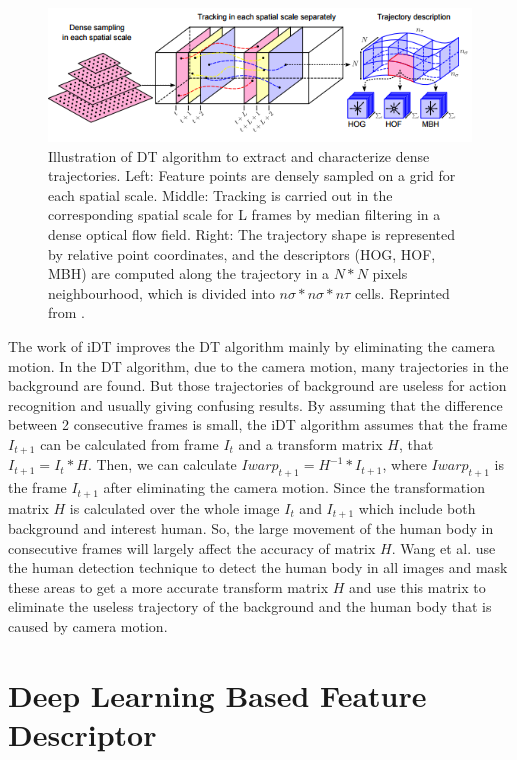 \begin{figure}
	\includegraphics[width=\linewidth]{figs/DT.png}
	\caption{Illustration of DT algorithm to extract and characterize dense trajectories. Left: Feature points
		are densely sampled on a grid for each spatial scale. Middle: Tracking is carried out in the corresponding
		spatial scale for L frames by median filtering in a dense optical flow field. Right: The trajectory shape
		is represented by relative point coordinates, and the descriptors (HOG, HOF, MBH) are computed along
		the trajectory in a \(N * N\) pixels neighbourhood, which is divided into \(n\sigma * n\sigma * n\tau \) cells. Reprinted from \cite{wang2012}.}
	\label{fig:DT}
\end{figure}
 
\par 
The work of iDT \cite{wang2013} improves the DT algorithm mainly by eliminating the camera motion. In the DT algorithm, due to the camera motion, many trajectories in the background are found. But those trajectories of background are useless for action recognition and usually giving confusing results. By assuming that the difference between 2 consecutive frames is small, the iDT algorithm assumes that the frame \(I_{t+1}\) can be calculated from frame \(I_t\) and a transform matrix \(H\), that \(I_{t+1} = I_t * H \).  Then, we can calculate \(Iwarp_{t+1} = H^{-1} * I_{t+1}\), where \(Iwarp_{t+1}\) is the frame \(I_{t+1}\) after eliminating the camera motion. Since the transformation matrix \(H\) is calculated over the whole image \(I_t\) and \(I_{t+1}\) which include both background and interest human. So, the large movement of the human body in consecutive frames will largely affect the accuracy of matrix \(H \). Wang et al. use the human detection technique to detect the human body in all images and mask these areas to get a more accurate transform matrix \(H\) and use this matrix to eliminate the useless trajectory of the background and the human body that is caused by camera motion.

\section{Deep Learning Based Feature Descriptor}
\label{2_3}

